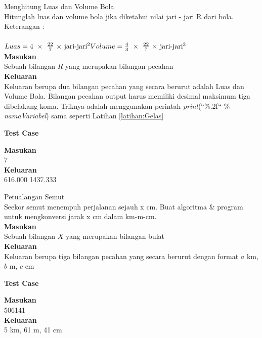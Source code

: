 \begin{permasalahan}{Menghitung Luas dan Volume Bola}\\
\label{prob:Volume}
	Hitunglah luas dan volume bola jika diketahui nilai jari - jari R dari bola. \\
	Keterangan : \\
  \ \\
		\begin{math}
				Luas = 4\ \times\ \frac{22}{7}\ \times\ $jari-jari$^{2} \\
				Volume = \frac{4}{3}\ \times\ \frac{22}{7}\  \times\ $jari-jari$^{3} \\
		\end{math}
   \ \\
	\textbf{Masukan}\\
	Sebuah bilangan $R$ yang merupakan bilangan pecahan\\
	\textbf{Keluaran}\\
	Keluaran berupa dua bilangan pecahan yang secara berurut adalah Luas dan Volume Bola. Bilangan pecahan output harus memiliki desimal maksimum tiga dibelakang koma. Triknya adalah menggunakan perintah  \textit{print}(``\%.2f`` \% \textit{namaVariabel}) sama seperti Latihan \ref{latihan:Gelas}
	\begin{center}
	\textbf{Test Case}\\
	\end{center}
	\textbf{Masukan}\\
	7\\
	\textbf{Keluaran}\\
	616.000 1437.333\\	
\end{permasalahan}

\begin{permasalahan}{Petualangan Semut}\\
\label{prob:PetualanganSemut}
	Seekor semut menempuh perjalanan sejauh x cm. Buat algoritma \& program untuk mengkonversi jarak x cm dalam km-m-cm. \\
	\textbf{Masukan}\\
	Sebuah bilangan $X$ yang merupakan bilangan bulat\\
	\textbf{Keluaran}\\
	Keluaran berupa tiga bilangan pecahan yang secara berurut dengan format $a$ km, $b$ m, $c$ cm
	\begin{center}
	\textbf{Test Case}\\
	\end{center}
	\textbf{Masukan}\\
	506141\\
	\textbf{Keluaran}\\
	5 km, 61 m, 41 cm
\end{permasalahan}

